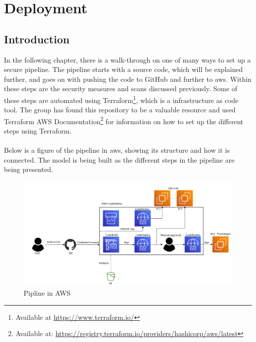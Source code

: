 \chapter{Deployment}
\label{Deployment}
\section{Introduction}
In the following chapter, there is a walk-through on one of many ways to set up a secure pipeline. The pipeline starts with a source code, which will be explained further, and goes on with pushing the code to GitHub and further to \acrshort{aws}. Within these steps are the security measures and scans discussed previously. Some of these steps are automated using Terraform\footnote{Available at \url{https://www.terraform.io/}}, which is a \gls{infrastructure as code} tool. The group has found this repository to be a valuable resource \cite{aws-cicd-pipeline} and used Terraform AWS Documentation\footnote{Available at: \url{https://registry.terraform.io/providers/hashicorp/aws/latest}} for information on how to set up the different steps using Terraform. 
\\~\\
Below is a figure of the pipeline in \acrshort{aws}, showing its structure and how it is connected. The model is being built as the different steps in the pipeline are being presented.
\vspace{2mm}
\begin{figure}[H]
    \centering
    \includegraphics[width=1\columnwidth]{Images/aws-piplin-7.png}
    \caption{Pipline in AWS}
    \label{fig: Pipeline in AWS}
\end{figure}

